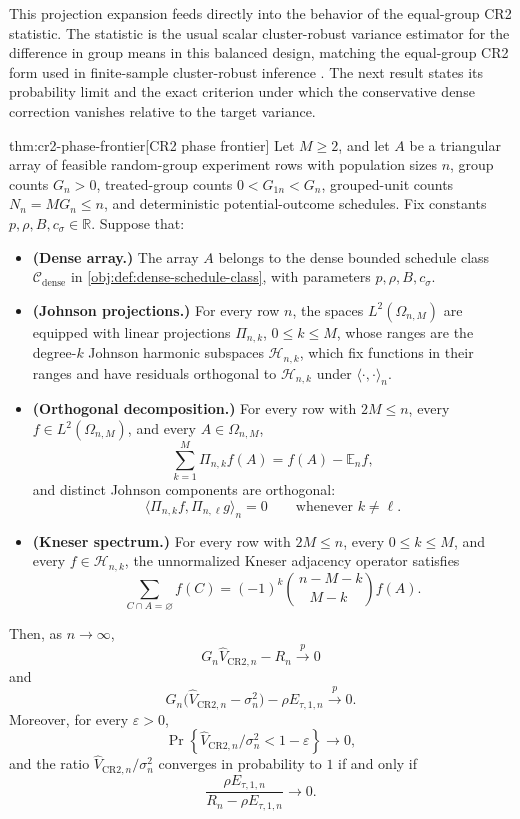 \documentclass[11pt]{article}
\begin{document}
This projection expansion feeds directly into the behavior of the equal-group CR2 statistic. The statistic  is the usual scalar cluster-robust variance estimator for the difference in group means in this balanced design, matching the equal-group CR2 form used in finite-sample cluster-robust inference \citep{PustejovskyTipton2018}. The next result states its probability limit and the exact criterion under which the conservative dense correction vanishes relative to the target variance.

\begin{theoremv}{thm:cr2-phase-frontier}[CR2 phase frontier]
Let \(M\ge 2\), and let \(A\) be a triangular array of feasible random-group experiment rows with population sizes \(n\), group counts \(G_n>0\), treated-group counts \(0<G_{1n}<G_n\), grouped-unit counts \(N_n=MG_n\le n\), and deterministic potential-outcome schedules.  Fix constants \(p,\rho,B,c_\sigma\in\mathbb R\).  Suppose that:
\begin{itemize}
\item \textbf{(Dense array.)} The array \(A\) belongs to the dense bounded schedule class \(\mathcal C_{\mathrm{dense}}\) in \cref{obj:def:dense-schedule-class}, with parameters \(p,\rho,B,c_\sigma\).
\item \textbf{(Johnson projections.)} For every row \(n\), the spaces \(L^2(\Omega_{n,M})\) are equipped with linear projections \(\Pi_{n,k}\), \(0\le k\le M\), whose ranges are the degree-\(k\) Johnson harmonic subspaces \(\mathcal H_{n,k}\), which fix functions in their ranges and have residuals orthogonal to \(\mathcal H_{n,k}\) under \(\langle\cdot,\cdot\rangle_n\).
\item \textbf{(Orthogonal decomposition.)} For every row with \(2M\le n\), every \(f\in L^2(\Omega_{n,M})\), and every \(A\in\Omega_{n,M}\),
\[
\sum_{k=1}^{M}\Pi_{n,k}f(A)=f(A)-\mathbb E_n f,
\]
and distinct Johnson components are orthogonal:
\[
\langle \Pi_{n,k}f,\Pi_{n,\ell}g\rangle_n=0
\qquad\text{whenever } k\ne \ell .
\]
\item \textbf{(Kneser spectrum.)} For every row with \(2M\le n\), every \(0\le k\le M\), and every \(f\in\mathcal H_{n,k}\), the unnormalized Kneser adjacency operator satisfies
\[
\sum_{C\cap A=\varnothing} f(C)
=
(-1)^k {\,n-M-k\choose M-k\,} f(A).
\]
\end{itemize}
Then, as \(n\to\infty\),
\[
G_n\widehat V_{\mathrm{CR2},n}-R_n \xrightarrow{p}0
\]
and
\[
G_n\bigl(\widehat V_{\mathrm{CR2},n}-\sigma_n^2\bigr)
-\rho E_{\tau,1,n}
\xrightarrow{p}0 .
\]
Moreover, for every \(\varepsilon>0\),
\[
\Pr\!\left\{
\widehat V_{\mathrm{CR2},n}/\sigma_n^2<1-\varepsilon
\right\}\longrightarrow 0 ,
\]
and the ratio \(\widehat V_{\mathrm{CR2},n}/\sigma_n^2\) converges in probability to \(1\) if and only if
\[
\frac{\rho E_{\tau,1,n}}{R_n-\rho E_{\tau,1,n}}\longrightarrow 0 .
\]
\end{theoremv}
\end{document}
